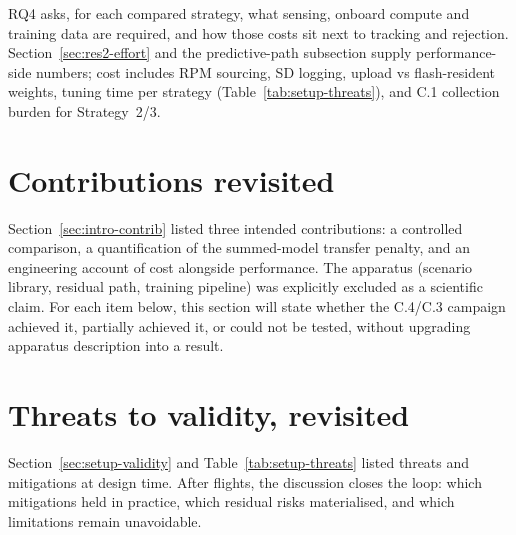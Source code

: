 RQ4 asks, for each compared strategy, what sensing, onboard compute and training data are required,
and how those costs sit next to tracking and rejection. Section~\ref{sec:res2-effort} and the
predictive-path subsection supply performance-side numbers; cost includes RPM sourcing, SD logging,
upload vs flash-resident weights, tuning time per strategy (Table~\ref{tab:setup-threats}), and
C.1 collection burden for Strategy~2/3.


\section{Contributions revisited}
\label{sec:disc-contrib}

Section~\ref{sec:intro-contrib} listed three intended contributions: a controlled comparison,
a quantification of the summed-model transfer penalty, and an engineering account of cost alongside
performance. The apparatus (scenario library, residual path, training pipeline) was explicitly
excluded as a scientific claim. For each item below, this section will state whether the C.4/C.3
campaign achieved it, partially achieved it, or could not be tested, without upgrading apparatus
description into a result.




\section{Threats to validity, revisited}
\label{sec:disc-validity}

Section~\ref{sec:setup-validity} and Table~\ref{tab:setup-threats} listed threats and mitigations
at design time. After flights, the discussion closes the loop: which mitigations held in practice,
which residual risks materialised, and which limitations remain unavoidable.

